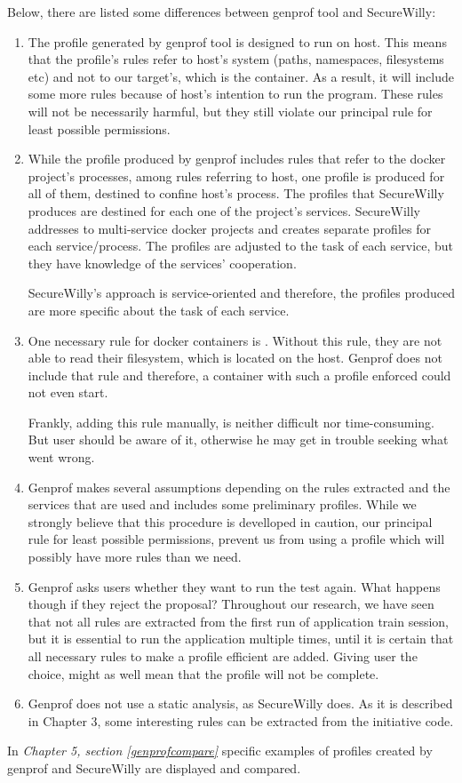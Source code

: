 Below, there are listed some differences between genprof tool and SecureWilly:

\begin{enumerate}
\item The profile generated by genprof tool is designed to run on host. This means that the profile's rules refer to host's system (paths, namespaces, filesystems etc) and not to our target's, which is the container.
As a result, it will include some more rules because of host's intention to run the program. These rules will not be necessarily harmful, but they still violate our principal rule for least possible permissions.

\item While the profile produced by genprof includes rules that refer to the docker project's processes, among rules referring to host, one profile is produced for all of them, destined to confine host's process. The profiles that SecureWilly produces are destined for each one of the project's services. SecureWilly addresses to multi-service docker projects and creates separate profiles for each service/process. The profiles are adjusted to the task of each service, but they have knowledge of the services' cooperation.

SecureWilly's approach is service-oriented and therefore, the profiles produced are more specific about the task of each service. 

\item One necessary rule for docker containers is . Without this rule, they are not able to read their filesystem, which is located on the host. Genprof does not include that rule and therefore, a container with such a profile enforced could not even start.

Frankly, adding this rule manually, is neither difficult nor time-consuming. But user should be aware of it, otherwise he may get in trouble seeking what went wrong.

\item Genprof makes several assumptions depending on the rules extracted and the services that are used and includes some preliminary profiles. While we strongly believe that this procedure is develloped in caution, our principal rule for least possible permissions, prevent us from using a profile which will possibly have more rules than we need.

\item Genprof asks users whether they want to run the test again. What happens though if they reject the proposal? Throughout our research, we have seen that not all rules are extracted from the first run of application train session, but it is essential to run the application multiple times, until it is certain that all necessary rules to make a profile efficient are added. Giving user the choice, might as well mean that the profile will not be complete.

\item Genprof does not use a static analysis, as SecureWilly does. As it is described in Chapter 3, some interesting rules can be extracted from the initiative code.
\end{enumerate}

In \textit{Chapter 5, section \ref{genprofcompare}} specific examples of profiles created by genprof and SecureWilly are displayed and compared.
